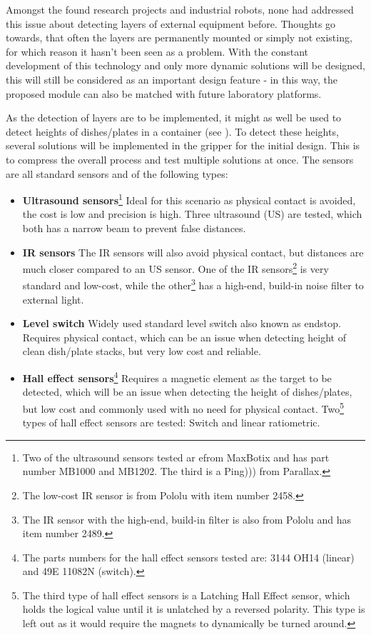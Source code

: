 \documentclass[10pt,a4paper]{article}
\begin{document}
	Amongst the found research projects and industrial robots, none had addressed this issue about detecting layers of external equipment before. Thoughts go towards, that often the layers are permanently mounted or simply not existing, for which reason it hasn't been seen as a problem. With the constant development of this technology and only more dynamic solutions will be designed, this will still be considered as an important design feature - in this way, the proposed module can also be matched with future laboratory platforms.
		
	As the detection of layers are to be implemented, it might as well be used to detect heights of dishes/plates in a container (see ). To detect these heights, several solutions will be implemented in the gripper for the initial design. This is to compress the overall process and test multiple solutions at once. The sensors are all standard sensors and of the following types:
	
	

		
	\begin{itemize}
		\item \textbf{Ultrasound sensors}\footnote{Two of the ultrasound sensors tested ar efrom MaxBotix and has part number MB1000 and MB1202. The third is a Ping))) from Parallax.} Ideal for this scenario as physical contact is avoided, the cost is low and precision is high. Three ultrasound (US) are tested, which both has a narrow beam to prevent false distances.
		\item \textbf{IR sensors} The IR sensors will also avoid physical contact, but distances are much closer compared to an US sensor. One of the IR sensors\footnote{The low-cost IR sensor is from Pololu with item number 2458.} is very standard and low-cost, while the other\footnote{The IR sensor with the high-end, build-in filter is also from Pololu and has item number 2489.} has a high-end, build-in noise filter to external light.
		\item \textbf{Level switch} Widely used standard level switch also known as endstop. Requires physical contact, which can be an issue when detecting height of clean dish/plate stacks, but very low cost and reliable.
		\item \textbf{Hall effect sensors}\footnote{The parts numbers for the hall effect sensors tested are: 3144 OH14 (linear) and 49E 11082N (switch).} Requires a magnetic element as the target to be detected, which will be an issue when detecting the height of dishes/plates, but low cost and commonly used with no need for physical contact. Two\footnote{The third type of hall effect sensors is a Latching Hall Effect sensor, which holds the logical value until it is unlatched by a reversed polarity. This type is left out as it would require the magnets to dynamically be turned around.} types of hall effect sensors are tested: Switch and linear ratiometric.	
	\end{itemize}
	
\end{document}
